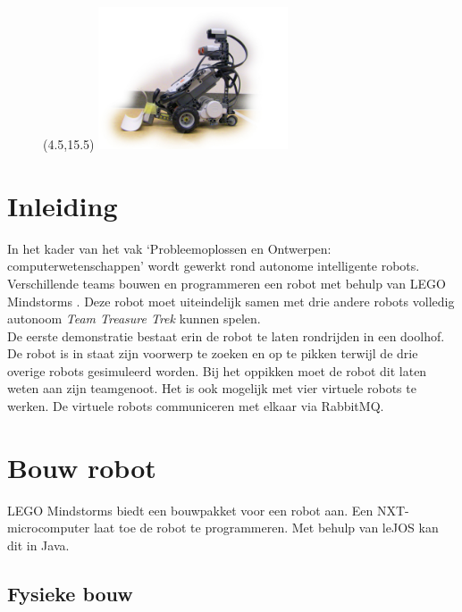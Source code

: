 \documentclass[tt1]{penoverslag}
\begin{document}
\setcounter{tocdepth}{2}
\tableofcontents
\begin{figure}[!hb]
\begin{textblock}{38}(4.5,15.5)
    \includegraphics[width=0.5\textwidth]{robotFP}
    \label{fig:robotFP2}
\end{textblock}
\end{figure}

\newpage


\section{Inleiding} %
\label{ssec:inl}
In het kader van het vak `Probleemoplossen en Ontwerpen: computerwetenschappen' wordt gewerkt rond autonome intelligente robots. Verschillende teams bouwen en programmeren een robot met behulp van LEGO Mindstorms \cite{mindstorms}. Deze robot moet uiteindelijk samen met drie andere robots volledig autonoom \textit{Team Treasure Trek} kunnen spelen.\\

De eerste demonstratie bestaat erin de robot te laten rondrijden in een doolhof. De robot is in staat zijn voorwerp te zoeken en op te pikken terwijl de drie overige robots gesimuleerd worden. Bij het oppikken moet de robot dit laten weten aan zijn teamgenoot. Het is ook mogelijk met vier virtuele robots te werken. De virtuele robots communiceren met elkaar via RabbitMQ.\\


\section{Bouw robot}
\label{ssec:bouwrob}
LEGO Mindstorms \cite{mindstorms} biedt een bouwpakket voor een robot aan. Een NXT-microcomputer laat toe de robot te programmeren. Met behulp van leJOS \cite{leJOS} kan dit in Java.


\subsection{Fysieke bouw}
\label{ssec:fysb}
\end{document}
